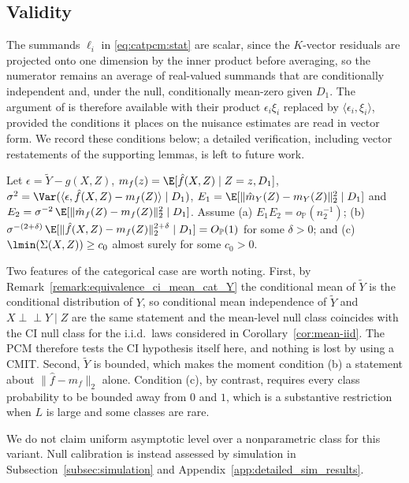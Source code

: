 \documentclass[twoside,11pt]{article}
\newcommand{\indep}{\perp \!\!\! \perp}
\begin{document}
\subsection{Validity}
\label{app:catpcm:validity}

The summands $\ell_i$ in \eqref{eq:catpcm:stat} are scalar, since the $K$-vector residuals are projected onto one dimension by the inner product before averaging, so the numerator remains an average of real-valued summands that are conditionally independent and, under the null, conditionally mean-zero given $D_1$. The argument of \citet[Theorem~4]{lundborg2024projected} is therefore available with their product $\epsilon_i \xi_i$ replaced by $\langle \epsilon_i, \xi_i \rangle$, provided the conditions it places on the nuisance estimates are read in vector form. We record these conditions below; a detailed verification, including vector restatements of the supporting lemmas, is left to future work.

\begin{assumption}
  \label{ass:catpcm}
  Let $\epsilon = \tilde{Y} - g(X,Z)$, $m_f(z) = \E[\hat{f}(X,Z) \mid Z = z, D_1]$, $\sigma^2 = \Var(\langle \epsilon, \hat{f}(X,Z) - m_f(Z)\rangle \mid D_1)$, $E_1 = \E[\lVert \hat{m}_Y(Z) - m_Y(Z) \rVert_2^2 \mid D_1]$ and $E_2 = \sigma^{-2}\,\E[\lVert \hat{m}_f(Z) - m_f(Z) \rVert_2^2 \mid D_1]$. Assume (a) $E_1 E_2 = o_{\mathbb{P}}(n_2^{-1})$; (b) $\sigma^{-(2+\delta)}\,\E[\lVert \hat{f}(X,Z) - m_f(Z)\rVert_2^{2+\delta} \mid D_1] = O_{\mathbb{P}}(1)$ for some $\delta > 0$; and (c) $\lmin(\Sigma(X,Z)) \geq c_0$ almost surely for some $c_0 > 0$.
\end{assumption}

Two features of the categorical case are worth noting. First, by Remark~\ref{remark:equivalence_ci_mean_cat_Y} the conditional mean of $\tilde{Y}$ is the conditional distribution of $Y$, so conditional mean independence of $\tilde{Y}$ and $X \indep Y \mid Z$ are the same statement and the mean-level null class coincides with the CI null class for the i.i.d.\ laws considered in Corollary~\ref{cor:mean-iid}. 
The PCM therefore tests the CI hypothesis itself here, and nothing is lost by using a CMIT. 
Second, $\tilde{Y}$ is bounded, which makes the moment condition (b) a statement about $\lVert \hat{f} - m_f \rVert_2$ alone. Condition (c), by contrast, requires every class probability to be bounded away from $0$ and $1$, which is a substantive restriction when $L$ is large and some classes are rare.

We do not claim uniform asymptotic level over a nonparametric class for this variant. Null calibration is instead assessed by simulation in Subsection~\ref{subsec:simulation} and Appendix~\ref{app:detailed_sim_results}.
\end{document}
